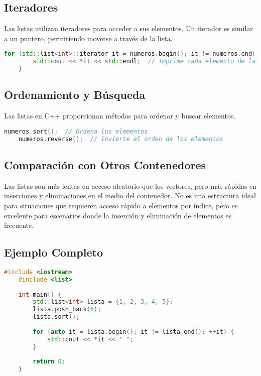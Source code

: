    \subsection{Iteradores}
    
    Las listas utilizan iteradores para acceder a sus elementos. Un iterador es similar a un puntero, permitiendo moverse a través de la lista.
    
    \begin{lstlisting}[language=C++]
    for (std::list<int>::iterator it = numeros.begin(); it != numeros.end(); ++it) {
        std::cout << *it << std::endl;  // Imprime cada elemento de la lista
    }
    \end{lstlisting}
    
    \subsection{Ordenamiento y Búsqueda}
    
    Las listas en C++ proporcionan métodos para ordenar y buscar elementos.
    
    \begin{lstlisting}[language=C++]
    numeros.sort();  // Ordena los elementos
    numeros.reverse();  // Invierte el orden de los elementos
    \end{lstlisting}
    
    \subsection{Comparación con Otros Contenedores}
    
    Las listas son más lentas en acceso aleatorio que los vectores, pero más rápidas en inserciones y eliminaciones en el medio del contenedor. No es una estructura ideal para situaciones que requieren acceso rápido a elementos por índice, pero es excelente para escenarios donde la inserción y eliminación de elementos es frecuente.
    
    \subsection{Ejemplo Completo}
    
    \begin{lstlisting}[language=C++]
    #include <iostream>
    #include <list>
    
    int main() {
        std::list<int> lista = {1, 2, 3, 4, 5};
        lista.push_back(6);
        lista.sort();
    
        for (auto it = lista.begin(); it != lista.end(); ++it) {
            std::cout << *it << " ";
        }
    
        return 0;
    }
    \end{lstlisting}
    
